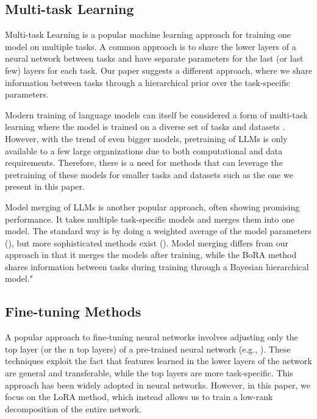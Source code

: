 \documentclass[fullpaper,final]{nldl}
\begin{document}
\subsection{Multi-task Learning}
Multi-task Learning \cite{caruanaMultitaskLearning1997} is a popular machine learning approach for training one model on multiple tasks. 
A common approach is to share the lower layers of a neural network between tasks and have separate parameters for the last (or last few) layers for each task. 
Our paper suggests a different approach, where we share information between tasks through a hierarchical prior over the task-specific parameters.

Modern training of language models can itself be considered a form of multi-task learning where the model is trained on a diverse set of tasks and datasets \cite{raffelExploringLimitsTransfer2023,brownLanguageModelsAre2020}.
However, with the trend of even bigger models, pretraining of LLMs is only available to a few large organizations due to both computational and data requirements. Therefore, there is a need for methods that can leverage the pretraining of these models for smaller tasks and datasets such as the one we present in this paper.

Model merging of LLMs \cite{yadavTIESMergingResolvingInterference2023,yuLanguageModelsAre2024,liDeepModelFusion2023} is another popular approach, often showing promising performance. It takes multiple task-specific models and merges them into one model. The standard way is by doing a weighted average of the model parameters (\cite{liDeepModelFusion2023}), but more sophisticated methods exist (\cite{yadavTIESMergingResolvingInterference2023, yuLanguageModelsAre2024}). Model merging differs from our approach in that it merges the models after training, while the BoRA method shares information between tasks during training through a Bayesian hierarchical model."

\subsection{Fine-tuning Methods}
A popular approach to fine-tuning neural networks involves adjusting only the top layer (or the n top layers) of a pre-trained neural network (e.g., \cite{yosinskiHowTransferableAre2014}). 
These techniques exploit the fact that features learned in the lower layers of the network are general and transferable, while the top layers are more task-specific. 
This approach has been widely adopted in neural networks. 
However, in this paper, we focus on the LoRA method, which instead allows us to train a low-rank decomposition of the entire network.
\end{document}
